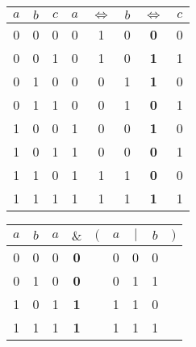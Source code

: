 \documentclass[11pt, landscape]{article}
\newcommand{\AEQ}{{\Leftrightarrow}}
\begin{document}
\vspace{1cm}

\begin{tabular}{|c|c|c|ccccc|} \hline
$a$&$b$&$c$&$a$&$\AEQ$&$b$&$\AEQ$&$c$\\\hline
0&0&0&0&1&0&\textbf{0}&0\\\hline
0&0&1&0&1&0&\textbf{1}&1\\\hline
0&1&0&0&0&1&\textbf{1}&0\\\hline
0&1&1&0&0&1&\textbf{0}&1\\\hline
1&0&0&1&0&0&\textbf{1}&0\\\hline
1&0&1&1&0&0&\textbf{0}&1\\\hline
1&1&0&1&1&1&\textbf{0}&0\\\hline
1&1&1&1&1&1&\textbf{1}&1\\\hline
\end{tabular}

\vspace{1cm}


\begin{tabular}{|c|c|ccccccc|} \hline
$a$&$b$&$a$&$\&$&$($&$a$&$|$&$b$&$)$\\\hline
0&0&0&\textbf{0}&&0&0&0&\\\hline
0&1&0&\textbf{0}&&0&1&1&\\\hline
1&0&1&\textbf{1}&&1&1&0&\\\hline
1&1&1&\textbf{1}&&1&1&1&\\\hline
\end{tabular}

\vspace{1cm}
\end{document}
